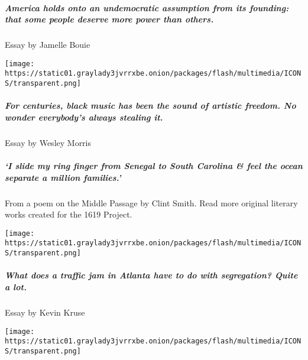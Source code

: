 \hypertarget{america-holds-onto-an-undemocratic-assumption-from-its-founding-that-some-people-deserve-more-power-than-others}{%
\subparagraph{America holds onto an undemocratic assumption from its
founding: that some people deserve more power than
others.}\label{america-holds-onto-an-undemocratic-assumption-from-its-founding-that-some-people-deserve-more-power-than-others}}

Essay by Jamelle Bouie

\texttt{[image: https://static01.graylady3jvrrxbe.onion/packages/flash/multimedia/ICONS/transparent.png]}

\href{/interactive/2019/08/14/magazine/music-black-culture-appropriation.html}{}

\hypertarget{for-centuries-black-music-has-been-the-sound-of-artistic-freedom-no-wonder-everybodys-always-stealing-it}{%
\subparagraph{For centuries, black music has been the sound of artistic
freedom. No wonder everybody's always stealing
it.}\label{for-centuries-black-music-has-been-the-sound-of-artistic-freedom-no-wonder-everybodys-always-stealing-it}}

Essay by Wesley Morris

\href{https://www.nytimes3xbfgragh.onion/interactive/2019/08/14/magazine/african-american-poets.html}{}

\hypertarget{i-slide-my-ring-finger-from-senegal-to-south-carolina--feel-the-ocean-separate-a-million-families}{%
\subparagraph{`I slide my ring finger from Senegal to South Carolina \&
feel the ocean separate a million
families.'}\label{i-slide-my-ring-finger-from-senegal-to-south-carolina--feel-the-ocean-separate-a-million-families}}

From a poem on the Middle Passage by Clint Smith. Read more original
literary works created for the 1619 Project.

\texttt{[image: https://static01.graylady3jvrrxbe.onion/packages/flash/multimedia/ICONS/transparent.png]}

\href{/interactive/2019/08/14/magazine/traffic-atlanta-segregation.html}{}

\hypertarget{what-does-a-traffic-jam-in-atlanta-have-to-do-with-segregation-quite-a-lot}{%
\subparagraph{What does a traffic jam in Atlanta have to do with
segregation? Quite a
lot.}\label{what-does-a-traffic-jam-in-atlanta-have-to-do-with-segregation-quite-a-lot}}

Essay by Kevin Kruse

\texttt{[image: https://static01.graylady3jvrrxbe.onion/packages/flash/multimedia/ICONS/transparent.png]}

